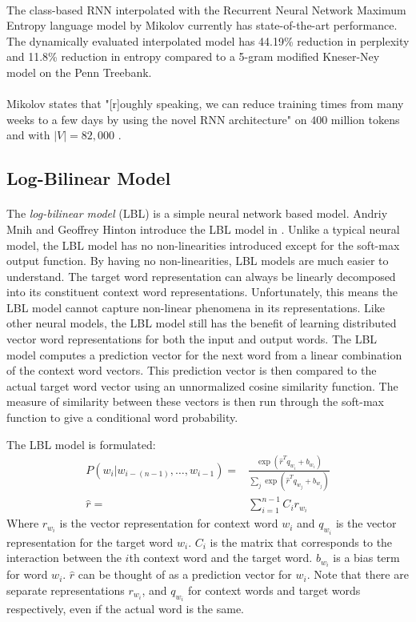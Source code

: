 \paragraph{}
The class-based RNN interpolated with the Recurrent Neural Network Maximum Entropy language model by Mikolov \cite{Mikolov2012} currently has state-of-the-art performance. The dynamically evaluated interpolated model has 44.19\% reduction in perplexity and 11.8\% reduction in entropy compared to a 5-gram modified Kneser-Ney model on the Penn Treebank.
\paragraph{}
Mikolov states that "[r]oughly speaking, we can reduce training times from many weeks to a few days by using the novel RNN architecture" on $400$ million tokens and with $|V|=82,000$ \cite[pg. 93]{Mikolov2012}. 

\subsection{Log-Bilinear Model} \label{sec:lbl}
\paragraph{}
The \emph{log-bilinear model} (LBL) is a simple neural network based model. Andriy Mnih and Geoffrey Hinton introduce the LBL model in \cite{MnihHinton2007}. Unlike a typical neural model, the LBL model has no non-linearities introduced except for the soft-max output function. By having no non-linearities, LBL models are much easier to understand. The target word representation can always be linearly decomposed into its constituent context word representations. Unfortunately, this means the LBL model cannot capture non-linear phenomena in its representations. Like other neural models, the LBL model still has the benefit of learning distributed vector word representations for both the input and output words.  The LBL model computes a prediction vector for the next word from a linear combination of the context word vectors. This prediction vector is then compared to the actual target word vector using an unnormalized cosine similarity function. The measure of similarity between these vectors is then run through the soft-max function to give a conditional word probability.

The LBL model is formulated:
\begin{align}
P(w_i | w_{i-(n-1)},\dots, w_{i-1})  =& \frac{ \exp( \hat{r}^T q_{w_i} +b_{w_i}) } { \sum_j \exp( \hat{r}^T q_{w_j} +b_{w_j})} \label{eq:LBL}
\\ 
\hat{r} =& \sum_{i=1}^{n-1} C_i r_{w_i} \nonumber
\end{align} 
Where $r_{w_i}$ is the vector representation for context word $w_i$ and $q_{w_i}$ is the vector representation for the target word $w_i$. $C_i$ is the matrix that corresponds to the interaction between the $i$th context word and the target word. $b_{w_i}$ is a bias term for word $w_i$. $\hat{r}$ can be thought of as a prediction vector for $w_i$. Note that there are separate representations $r_{w_i}$, and $q_{w_i}$ for context words and target words respectively, even if the actual word is the same.

